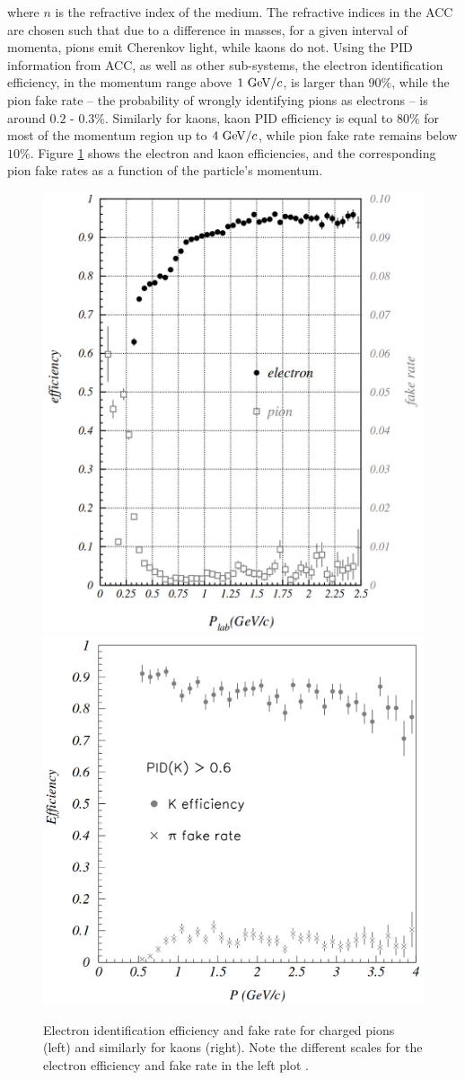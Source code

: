 where $n$ is the refractive index of the medium. The refractive indices in the ACC are chosen such that due to a difference in masses, for a given interval of momenta, pions emit Cherenkov light, while kaons do not. Using the PID information from ACC, as well as other sub-systems, the electron identification efficiency, in the momentum range above $1\mathrm{~GeV}/c$, is larger than $90\%$, while the pion fake rate -- the probability of wrongly identifying pions as electrons -- is around $0.2$ - $0.3\%$. Similarly for kaons, kaon PID efficiency is equal to $80\%$ for most of the momentum region up to $4\mathrm{~GeV}/c$, while pion fake rate remains below $10\%$. Figure \ref{fig:ACC_eff} shows the electron and kaon efficiencies, and the corresponding pion fake rates as a function of the particle's momentum.

\begin{figure}[H]
	\centering
	\captionsetup{width=0.8\linewidth}
	\includegraphics[width=0.48\linewidth]{fig/setup/ACC_eff1}
	\includegraphics[width=0.48\linewidth,trim = 0cm -4cm 0cm 0cm]{fig/setup/ACC_eff2}
	\caption{Electron identification efficiency and fake rate for charged pions (left) and similarly for kaons (right). Note the different scales for the electron efficiency and fake rate in the left plot \cite{ABASHIAN2002117}.}
	\label{fig:ACC_eff}
\end{figure}



